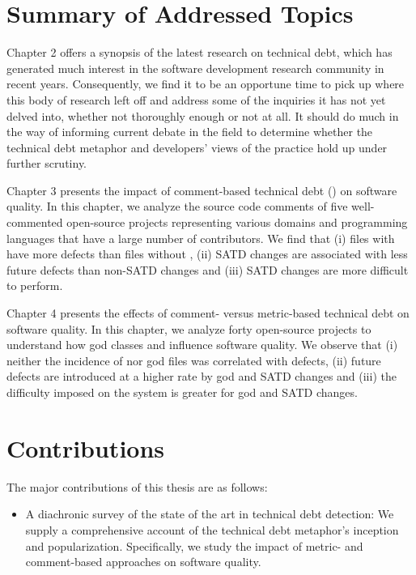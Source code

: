 
\section{Summary of Addressed Topics}


Chapter 2 offers a synopsis of the latest research on technical debt, which has generated much interest in the software development research community in recent years. Consequently, we find it to be an opportune time to pick up where this body of research left off and address some of the inquiries it has not yet delved into, whether not thoroughly enough or not at all. It should do much in the way of informing current debate in the field to determine whether the technical debt metaphor and developers' views of the practice hold up under further scrutiny.

Chapter 3 presents the impact of comment-based technical debt (\SATD) on software quality. In this chapter, we analyze the source code comments of five well-commented open-source projects representing various domains and programming languages that have a large number of contributors. We find that (i) files with \SATD have more defects than files without \SATD, (ii) SATD changes are associated with less future defects than non-SATD changes and (iii) SATD changes are more difficult to perform.

Chapter 4 presents the effects of comment- versus metric-based technical debt on software quality. In this chapter, we analyze forty open-source projects to understand how god classes and \SATD influence software quality. We observe that (i) neither the incidence of \SATD nor god files was correlated with defects, (ii) future defects are introduced at a higher rate by god and SATD changes and (iii) the difficulty imposed on the system is greater for god and SATD changes.

\section{Contributions}
The major contributions of this thesis are as follows:

\begin{itemize}
	\item A diachronic survey of the state of the art in technical debt detection: We supply a comprehensive account of the technical debt metaphor's inception and popularization. Specifically, we study the impact of metric- and comment-based approaches on software quality.
\end{itemize}
